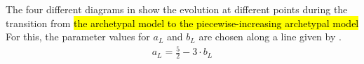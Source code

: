 The four different diagrams in  show the evolution at different points during the transition from \hl{the archetypal model to the piecewise-increasing archetypal model}
For this, the parameter values for $a_L$ and $b_L$ are chosen along a line given by .
\begin{align}
	a_L = \frac{5}{2} - 3 \cdot b_L
	\label{equ:add.change.paramline}
\end{align}

\begin{figure}
	\centering
	 \\
\end{figure}
